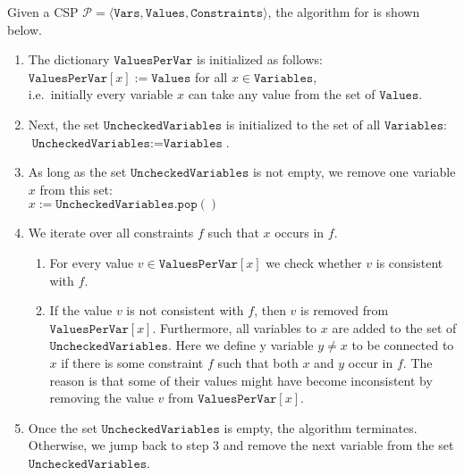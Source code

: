 \noindent
Given a \textsc{CSP} $\mathcal{P} = \langle \mathtt{Vars}, \mathtt{Values}, \mathtt{Constraints} \rangle$, 
the algorithm for  is shown below. 
\begin{enumerate}
\item The dictionary $\texttt{ValuesPerVar}$ is initialized as follows:
      \\[0.2cm]
      \hspace*{1.3cm}
      $\texttt{ValuesPerVar}[x] := \texttt{Values}$ \quad for all $x \in \texttt{Variables}$,
      \\[0.2cm]
      i.e.~initially every variable $x$ can take any value from the set of $\texttt{Values}$.
\item Next, the set $\texttt{UncheckedVariables}$ is initialized to the set of all $\texttt{Variables}$:
      \\[0.2cm]
      \hspace*{1.3cm}
      $\texttt{UncheckedVariables} := \texttt{Variables}$.
\item As long as the set $\texttt{UncheckedVariables}$ is not empty, we remove one variable $x$ from this set:
      \\[0.2cm]
      \hspace*{1.3cm}
      $x := \texttt{UncheckedVariables}.\texttt{pop}()$
\item We iterate over all constraints $f$ such that $x$ occurs in $f$.  
      \begin{enumerate}
      \item For every value $v \in \texttt{ValuesPerVar}[x]$ we check whether $v$ is consistent with $f$.
      \item If the value $v$ is not consistent with $f$, then $v$ is removed from $\texttt{ValuesPerVar}[x]$.
            Furthermore, all variables  to $x$ are added to the set of 
            $\texttt{UncheckedVariables}$.  Here we define y variable $y \not= x$ to be connected to $x$ if
            there is some constraint $f$ such that both $x$ and $y$ occur in $f$.  The reason is that some of
            their values might have become inconsistent by removing the value $v$ from
            $\texttt{ValuesPerVar}[x]$.
      \end{enumerate}
\item Once the set $\texttt{UncheckedVariables}$ is empty, the algorithm terminates.  Otherwise, we jump back to step 3
      and remove the next variable from the set $\texttt{UncheckedVariables}$.
\end{enumerate}
